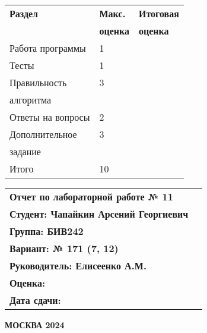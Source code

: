 \begin{titlepage}
    \begin{minipage}{0.35\textwidth}
        \begin{tabular}{|l|l|l|}
            \hline
            \textbf{Раздел} & \textbf{Макс.} & \textbf{Итоговая}\\
            & \textbf{оценка} & \textbf{оценка} \\[2ex]
            \hline
            Работа программы & 1 & \\[3ex]
            \hline
            Тесты & 1 & \\[3ex]
            \hline
            Правильность & 3 & \\
            алгоритма & & \\[3ex]
            \hline
            Ответы на вопросы & 2 & \\[3ex]
            \hline
            Дополнительное & 3 & \\
            задание & & \\[3ex]
            \hline
            Итого & 10 & \\[3ex]
            \hline
        \end{tabular}
    \end{minipage}%
    \hfill
    \begin{minipage}{0.45\textwidth}
        \begin{tabular}{lc}
            \textbf{Отчет по лабораторной работе № 11} & \\[2ex]
            \textbf{Студент: Чапайкин Арсений Георгиевич} &\\[2ex]
            \textbf{Группа: БИВ242} & \\[2ex]
            \textbf{Вариант: № 171 (7, 12)} &\\[2ex]
            \textbf{Руководитель: Елисеенко А.М.} &\\[2ex]
            \textbf{Оценка:} &\\[2ex]
            \textbf{Дата сдачи:} &\\[2ex]
        \end{tabular}
    \end{minipage}%
    \vspace*{\fill}
    \begin{center}
        \textbf{МОСКВА 2024}
    \end{center}
\end{titlepage}

